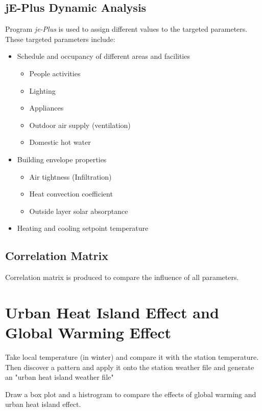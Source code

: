 \documentclass[11pt, a4paper]{article}
\theoremstyle{definition}
\begin{document}
	\subsection{jE-Plus Dynamic Analysis}
		Program \textit{je-Plus} is used to assign different values to the targeted parameters. These targeted parameters include:
		\begin{itemize}
			\item Schedule and occupancy of different areas and facilities
				\begin{itemize}
					\item People activities
					\item Lighting
					\item Appliances
					\item Outdoor air supply (ventilation)
					\item Domestic hot water
				\end{itemize}
			\item Building envelope properties
				\begin{itemize}
					\item Air tightness (Infiltration)
					\item Heat convection coefficient
					\item Outside layer solar absorptance
				\end{itemize}
			\item Heating and cooling setpoint temperature
		\end{itemize}
	
	\subsection{Correlation Matrix}
		Correlation matrix is produced to compare the influence of all parameters.


\section{Urban Heat Island Effect and Global Warming Effect}
	Take local temperature (in winter) and compare it with the station temperature. Then discover a pattern and apply it onto the station weather file and generate an "urban heat island weather file"

	Draw a box plot and a histrogram to compare the effects of global warming and urban heat island effect.




\begin{comment}
	\end{multicols*}
	\end{landscape}
\end{comment}
\end{document}

